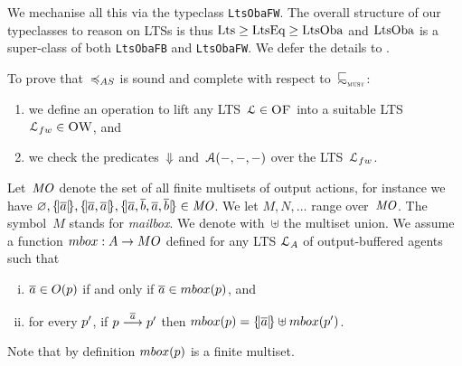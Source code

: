 We mechanise all this via the typeclass
\lstinline!LtsObaFW!. The overall structure of our typeclasses to reason on LTSs is thus
  $\text{\lstinline!Lts!} \geq \text{\lstinline!LtsEq!} \geq \text{\lstinline!LtsOba!}$ and
  $\text{\lstinline!LtsOba!}$ is a super-class of both \lstinline!LtsObaFB! and \lstinline!LtsObaFW!.
We defer the details to .


To prove that~$\asleq$ is sound and complete with respect to~$\testleqS$:
\begin{enumerate} \item we define an operation to lift any LTS~$\mathcal{L} \in \textsc{OF}$
into a suitable LTS~$\genlts_{\fw} \in \obaFW$, and \item we check the
predicates~$\mathrel{\Downarrow}$ and~$\mathcal{A}(-,-,-)$ over the LTS~$\genlts_{\fw}$.
\end{enumerate}



Let~$\mathit{MO}$ denote the set of all finite multisets of output actions, 
for instance we have $\varnothing, \{\!| \overline{ a } |\!\}, \{\!| \overline{ a },   \overline{
    a }  |\!\}, \{\!| \overline{ a },  \overline{ b },  \overline{ a },  \overline{ b }|\!\} \in
\mathit{MO}$.
We let %
$M, N, \ldots$ range over~$\mathit{MO}$. The symbol~$M$ stands for {\em mailbox}.
We denote with~$\uplus$ the multiset union.
We assume a function $\outputmultisetSym : A \rightarrow MO$ defined for any
LTS $\mathcal{L}_A$ of output-buffered agents such that
\begin{enumerate}[(i)]
\item
  $\overline{a} \in O(p)$ if and only if $\co{\aa} \in \outputmultiset{\server}$, and
\item
  for every $p'$, if $p \mathrel{\overset{\overline{a}}\longrightarrow} p'$ then $\outputmultiset{\server} = \mset{\co{\aa}} \uplus \outputmultiset{\server'}$.
\end{enumerate}
Note that by definition $\outputmultiset{ \server }$ is a finite multiset.

